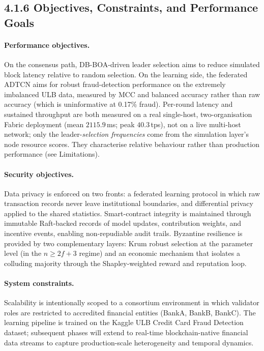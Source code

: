 \subsection*{4.1.6 Objectives, Constraints, and Performance Goals}

\paragraph{Performance objectives.}
On the consensus path, DB-BOA-driven leader selection aims to reduce simulated block latency relative to random selection. On the learning side, the federated ADTCN aims for robust fraud-detection performance on the extremely imbalanced ULB data, measured by MCC and balanced accuracy rather than raw accuracy (which is uninformative at 0.17\% fraud). Per-round latency and sustained throughput are both measured on a real single-host, two-organisation Fabric deployment (mean $2115.9$\,ms; peak $40.3$\,tps), not on a live multi-host network; only the leader-\emph{selection frequencies} come from the simulation layer's node resource scores. They characterise relative behaviour rather than production performance (see Limitations).

\paragraph{Security objectives.}
Data privacy is enforced on two fronts: a federated learning protocol in which raw transaction records never leave institutional boundaries, and differential privacy applied to the shared statistics. Smart-contract integrity is maintained through immutable Raft-backed records of model updates, contribution weights, and incentive events, enabling non-repudiable audit trails. Byzantine resilience is provided by two complementary layers: Krum robust selection at the parameter level (in the $n\ge 2f+3$ regime) and an economic mechanism that isolates a colluding majority through the Shapley-weighted reward and reputation loop.

\paragraph{System constraints.}
Scalability is intentionally scoped to a consortium environment in which validator roles are restricted to accredited financial entities (BankA, BankB, BankC). The learning pipeline is trained on the Kaggle ULB Credit Card Fraud Detection dataset; subsequent phases will extend to real-time blockchain-native financial data streams to capture production-scale heterogeneity and temporal dynamics.

